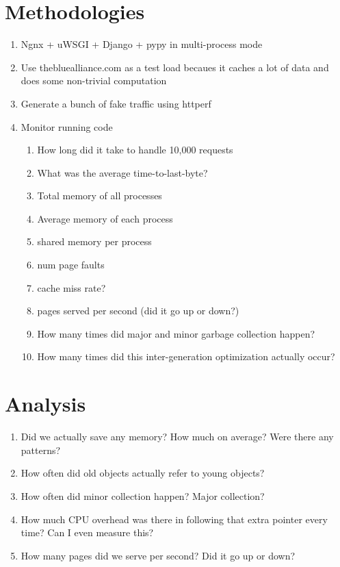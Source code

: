 \documentclass{article}
\begin{document}
  \section{Methodologies}
  \begin{enumerate}
	\item Ngnx + uWSGI + Django + pypy in multi-process mode
	\item Use thebluealliance.com as a test load becaues it caches a lot of data and does some non-trivial computation
	\item Generate a bunch of fake traffic using httperf
	\item Monitor running code
	  \begin{enumerate}
        \item How long did it take to handle 10,000 requests
        \item What was the average time-to-last-byte?
		\item Total memory of all processes
		\item Average memory of each process
		\item shared memory per process
		\item num page faults
		\item cache miss rate?
		\item pages served per second (did it go up or down?)
		\item How many times did major and minor garbage collection happen?
		\item How many times did this inter-generation optimization actually occur?
	  \end{enumerate}
  \end{enumerate}

  \section{Analysis}
  \begin{enumerate}
	\item Did we actually save any memory?  How much on average?  Were there any patterns?   
	\item How often did old objects actually refer to young objects?  
	\item How often did minor collection happen?  Major collection?
	\item How much CPU overhead was there in following that extra pointer every time?  Can I even measure this?
	\item How many pages did we serve per second?  Did it go up or down?
  \end{enumerate}
\end{document}
